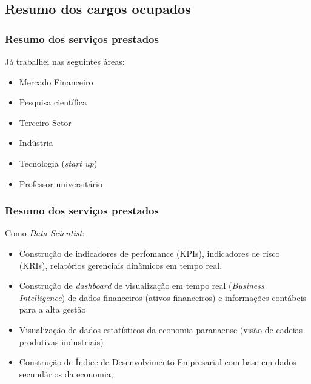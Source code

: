 \documentclass{beamer}
\begin{document}
\subsection{Resumo dos cargos ocupados}

\begin{frame}
\frametitle{Resumo dos serviços prestados}

\footnotesize
Já trabalhei nas seguintes áreas:

\small
\begin{itemize}
    \item Mercado Financeiro
    \item Pesquisa científica
    \item Terceiro Setor 
    \item Indústria 
    \item Tecnologia (\textit{start up})
    \item Professor universitário
\end{itemize}


\end{frame}

\begin{frame}
\frametitle{Resumo dos serviços prestados}

\footnotesize
Como \textit{Data Scientist}:


\begin{itemize}
    \item<1-4> Construção de indicadores de perfomance (KPIs), indicadores de risco (KRIs), relatórios gerenciais dinâmicos em tempo real.
    \item<2-4> Construção de \textit{dashboard} de visualização em tempo real (\textit{Business Intelligence}) de dados financeiros (ativos financeiros) e informações contábeis para a alta gestão 
    \item<3-4> Visualização de dados estatísticos da economia paranaense (visão de cadeias produtivas industriais)
    \item<4-4> Construção de Índice de Desenvolvimento Empresarial com base em dados secundários da economia;
\end{itemize}

\end{frame}
\end{document}
